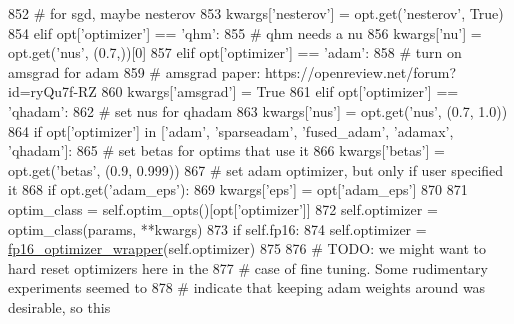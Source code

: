 \begin{DoxyCode}
852                 \textcolor{comment}{# for sgd, maybe nesterov}
853                 kwargs[\textcolor{stringliteral}{'nesterov'}] = opt.get(\textcolor{stringliteral}{'nesterov'}, \textcolor{keyword}{True})
854             \textcolor{keywordflow}{elif} opt[\textcolor{stringliteral}{'optimizer'}] == \textcolor{stringliteral}{'qhm'}:
855                 \textcolor{comment}{# qhm needs a nu}
856                 kwargs[\textcolor{stringliteral}{'nu'}] = opt.get(\textcolor{stringliteral}{'nus'}, (0.7,))[0]
857         \textcolor{keywordflow}{elif} opt[\textcolor{stringliteral}{'optimizer'}] == \textcolor{stringliteral}{'adam'}:
858             \textcolor{comment}{# turn on amsgrad for adam}
859             \textcolor{comment}{# amsgrad paper: https://openreview.net/forum?id=ryQu7f-RZ}
860             kwargs[\textcolor{stringliteral}{'amsgrad'}] = \textcolor{keyword}{True}
861         \textcolor{keywordflow}{elif} opt[\textcolor{stringliteral}{'optimizer'}] == \textcolor{stringliteral}{'qhadam'}:
862             \textcolor{comment}{# set nus for qhadam}
863             kwargs[\textcolor{stringliteral}{'nus'}] = opt.get(\textcolor{stringliteral}{'nus'}, (0.7, 1.0))
864         \textcolor{keywordflow}{if} opt[\textcolor{stringliteral}{'optimizer'}] \textcolor{keywordflow}{in} [\textcolor{stringliteral}{'adam'}, \textcolor{stringliteral}{'sparseadam'}, \textcolor{stringliteral}{'fused\_adam'}, \textcolor{stringliteral}{'adamax'}, \textcolor{stringliteral}{'qhadam'}]:
865             \textcolor{comment}{# set betas for optims that use it}
866             kwargs[\textcolor{stringliteral}{'betas'}] = opt.get(\textcolor{stringliteral}{'betas'}, (0.9, 0.999))
867             \textcolor{comment}{# set adam optimizer, but only if user specified it}
868             \textcolor{keywordflow}{if} opt.get(\textcolor{stringliteral}{'adam\_eps'}):
869                 kwargs[\textcolor{stringliteral}{'eps'}] = opt[\textcolor{stringliteral}{'adam\_eps'}]
870 
871         optim\_class = self.optim\_opts()[opt[\textcolor{stringliteral}{'optimizer'}]]
872         self.optimizer = optim\_class(params, **kwargs)
873         \textcolor{keywordflow}{if} self.fp16:
874             self.optimizer = \hyperlink{namespaceparlai_1_1utils_1_1misc_a7836ac7469dc5744e0ad9e5e54da2396}{fp16\_optimizer\_wrapper}(self.optimizer)
875 
876         \textcolor{comment}{# TODO: we might want to hard reset optimizers here in the}
877         \textcolor{comment}{# case of fine tuning. Some rudimentary experiments seemed to}
878         \textcolor{comment}{# indicate that keeping adam weights around was desirable, so this}

\end{DoxyCode}
